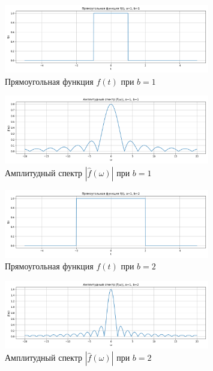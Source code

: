 \begin{figure}[H]
    \centering
    \includegraphics[width=0.8\textwidth]{rect_function_b1.png}
    \caption{Прямоугольная функция $f(t)$ при $b = 1$}
\end{figure}

\begin{figure}[H]
    \centering
    \includegraphics[width=0.8\textwidth]{rect_fourier_b1.png}
    \caption{Амплитудный спектр $|\hat{f}(\omega)|$ при $b = 1$}
\end{figure}

\begin{figure}[H]
    \centering
    \includegraphics[width=0.8\textwidth]{rect_function_b2.png}
    \caption{Прямоугольная функция $f(t)$ при $b = 2$}
\end{figure}

\begin{figure}[H]
    \centering
    \includegraphics[width=0.8\textwidth]{rect_fourier_b2.png}
    \caption{Амплитудный спектр $|\hat{f}(\omega)|$ при $b = 2$}
\end{figure}

